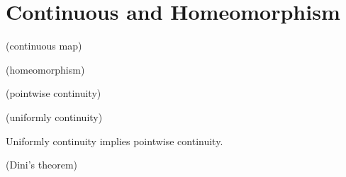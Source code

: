 \chapter{Continuous and Homeomorphism}

\begin{definition}
(continuous map)
\end{definition}

\begin{definition}
(homeomorphism)
\end{definition}

\begin{definition}
(pointwise continuity)
\end{definition}

\begin{definition}
(uniformly continuity)
\end{definition}

\begin{theorem}
Uniformly continuity implies pointwise continuity. 
\end{theorem}

\begin{theorem}
(Dini's theorem)
\end{theorem}


